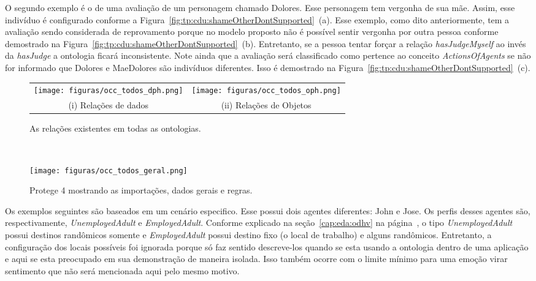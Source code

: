 O segundo exemplo é o de uma avaliação de um personagem chamado Dolores. Esse
personagem tem vergonha de sua mãe. Assim, esse indivíduo é configurado
conforme a Figura~\ref{fig:tp:cdu:shameOtherDontSupported}~(a).
Esse exemplo, como dito anteriormente, tem a avaliação sendo considerada de
reprovamento porque no modelo proposto não é possível sentir vergonha por
outra pessoa conforme demostrado na
Figura~\ref{fig:tp:cdu:shameOtherDontSupported}~(b). Entretanto, se a pessoa
tentar forçar a relação \emph{hasJudgeMyself} ao invés da \emph{hasJudge} a
ontologia ficará inconsistente. Note ainda que a avaliação será classificado
como pertence ao conceito \emph{ActionsOfAgents} se não for informado que
Dolores e MaeDolores são indivíduos diferentes. Isso é demostrado na
Figura~\ref{fig:tp:cdu:shameOtherDontSupported}~(c).

\begin{figure}[ht]
    \centering
	\begin{minipage}[t]{\linewidth}
		\centering
	    \begin{tabular}{cc}
		\texttt{[image: figuras/occ\_todos\_dph.png]} \hspace{1cm} & \texttt{[image: figuras/occ\_todos\_oph.png]} \\
	    (i) Relações de dados & (ii) Relações de Objetos
	    \end{tabular}
		\caption{As relações existentes em todas as ontologias.}
		\label{fig:tp:cdu:relations}
	\end{minipage} \vspace{0.3cm} \\
	\begin{minipage}[b]{\linewidth}
		\centering
		\texttt{[image: figuras/occ\_todos\_geral.png]}
		\caption{Protege 4 mostrando as importações, dados gerais e regras.}
		\label{fig:tp:cdu:geral}
	\end{minipage}
\end{figure}

Os exemplos seguintes são baseados em um cenário especifico. Esse possui
dois agentes diferentes: John e Jose. Os perfis desses agentes
são, respectivamente, \emph{UnemployedAdult} e \emph{EmployedAdult}.
Conforme explicado na seção~\ref{cap:eda:odhv} na página~\pageref{ex:tipos},
o tipo \emph{UnemployedAdult} possui destinos randômicos somente e
\emph{EmployedAdult} possui destino fixo (o local de trabalho) e alguns
randômicos. Entretanto, a configuração dos locais possíveis foi ignorada
porque só faz sentido descreve-los quando se esta usando a ontologia
dentro de uma aplicação e aqui se esta preocupado em sua demonstração de maneira
isolada. Isso também ocorre com o limite mínimo para uma emoção virar
sentimento que não será mencionada aqui pelo mesmo motivo.

